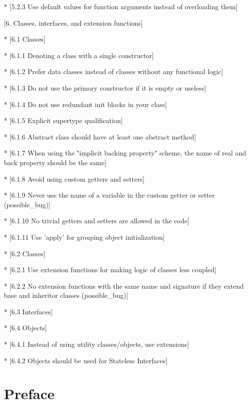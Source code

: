     * [5.2.3 Use default values for function arguments instead of overloading them]           



[6. Classes, interfaces, and extension functions]                 

* [6.1 Classes]      

    * [6.1.1 Denoting a class with a single constructor]

    * [6.1.2 Prefer data classes instead of classes without any functional logic] 

    * [6.1.3 Do not use the primary constructor if it is empty or useless] 

    * [6.1.4 Do not use redundant init blocks in your class]

    * [6.1.5 Explicit supertype qualification] 

    * [6.1.6 Abstract class should have at least one abstract method] 

    * [6.1.7 When using the "implicit backing property" scheme, the name of real and back property should be the same]

    * [6.1.8 Avoid using custom getters and setters] 

    * [6.1.9 Never use the name of a variable in the custom getter or setter (possible\_bug)] 

    * [6.1.10 No trivial getters and setters are allowed in the code]

    * [6.1.11 Use 'apply' for grouping object initialization] 

* [6.2 Classes]   

    * [6.2.1 Use extension functions for making logic of classes less coupled]

    * [6.2.2 No extension functions with the same name and signature if they extend base and inheritor classes (possible\_bug)] 

* [6.3 Interfaces]            

* [6.4 Objects]      

    * [6.4.1 Instead of using utility classes/objects, use extensions]

    * [6.4.2 Objects should be used for Stateless Interfaces] 





\section*{\textbf{Preface}}

